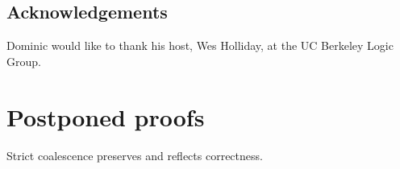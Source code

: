 \documentclass[UKenglish]{lipics-v2016}
\theoremstyle{plain}
\newcommand\+{+}
\renewcommand\*{\times}
\begin{document}

\subsection*{Acknowledgements}

Dominic would like to thank his host, Wes Holliday, at the UC Berkeley Logic Group.





\newpage
\appendix

\section{Postponed proofs}


\setcounter{theorem}{\thelemcorrect}
\begin{lemma}[Restatement]
Strict coalescence preserves and reflects correctness.
\end{lemma}
\end{document}
